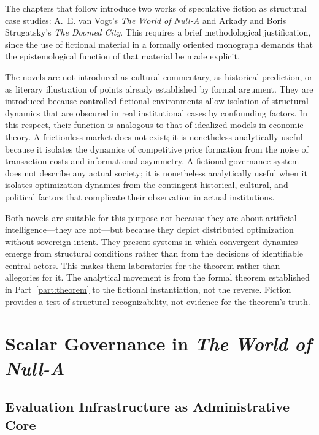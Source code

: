 \documentclass[12pt, oneside]{book}
\theoremstyle{plain}
\theoremstyle{definition}
\theoremstyle{remark}
\theoremstyle{definition}
\begin{document}
The chapters that follow introduce two works of speculative fiction as structural
case studies: A.~E. van Vogt's \textit{The World of Null-A} and Arkady and Boris
Strugatsky's \textit{The Doomed City}. This requires a brief methodological
justification, since the use of fictional material in a formally oriented monograph
demands that the epistemological function of that material be made explicit.

The novels are not introduced as cultural commentary, as historical prediction, or
as literary illustration of points already established by formal argument. They are
introduced because controlled fictional environments allow isolation of structural
dynamics that are obscured in real institutional cases by confounding factors. In
this respect, their function is analogous to that of idealized models in economic
theory. A frictionless market does not exist; it is nonetheless analytically useful
because it isolates the dynamics of competitive price formation from the noise of
transaction costs and informational asymmetry. A fictional governance system does
not describe any actual society; it is nonetheless analytically useful when it
isolates optimization dynamics from the contingent historical, cultural, and
political factors that complicate their observation in actual institutions.

Both novels are suitable for this purpose not because they are about artificial
intelligence---they are not---but because they depict distributed optimization
without sovereign intent. They present systems in which convergent dynamics emerge
from structural conditions rather than from the decisions of identifiable central
actors. This makes them laboratories for the theorem rather than allegories for it.
The analytical movement is from the formal theorem established in Part~\ref{part:theorem}
to the fictional instantiation, not the reverse. Fiction provides a test of structural
recognizability, not evidence for the theorem's truth.

\section{Scalar Governance in \textit{The World of Null-A}}
\label{sec:nulla}

\subsection{Evaluation Infrastructure as Administrative Core}
\end{document}
